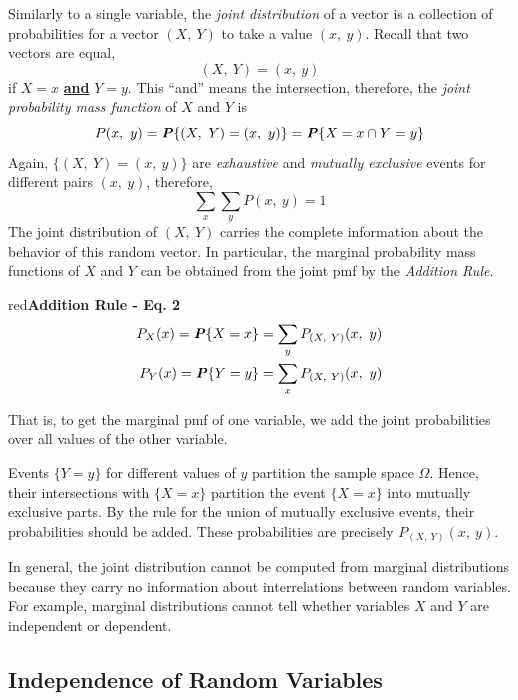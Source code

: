 \documentclass{article}
\newenvironment{formula}[1]{\begin{mybox}{red}{\textbf{#1}}}{\end{mybox}}
\newcommand{\prob}[1]{\textbf{\textit{P}}\{#1\}}
\begin{document}
Similarly to a single variable, the \textit{joint distribution} of a vector is a collection of probabilities for a vector $(X,\ Y)$ to take a value $(x,\ y)$. Recall that two vectors are equal,
\begin{equation*}
    (X,\ Y) = (x,\ y)
\end{equation*}
if $X = x$ \textbf{\underline{and}} $Y = y$. This ``and'' means the intersection, therefore, the \textit{joint probability mass function} of $X$ and $Y$ is
\begin{equation*}
    P(x,\ y) = \prob{(X,\ Y) = (x,\ y)} = \prob{X = x \cap Y = y}
\end{equation*}
Again, $\{(X,\ Y ) = (x,\ y)\}$ are \textit{exhaustive} and \textit{mutually exclusive} events for different pairs $(x,\ y)$, therefore,
\begin{equation*}
    \sum_x \sum_y P(x,\ y) = 1
\end{equation*}
The joint distribution of $(X,\ Y)$ carries the complete information about the behavior of this random vector. In particular, the marginal probability mass functions of $X$ and $Y$ can be obtained from the joint pmf by the \textit{Addition Rule}.

\begin{formula}{Addition Rule - Eq. 2}
\begin{align*}
    P_X(x) = \prob{X = x} = \sum_y P_{(X,\ Y)} (x,\ y)\\
    P_Y(x) = \prob{Y = y} = \sum_x P_{(X,\ Y)} (x,\ y)\\
\end{align*}
\end{formula}
That is, to get the marginal pmf of one variable, we add the joint probabilities over all values of the other variable.

Events $\{Y = y\}$ for different values of $y$ partition the sample space $\Omega$. Hence, their intersections with $\{X = x\}$ partition the event $\{X = x\}$ into mutually exclusive parts. By the rule for the union of mutually exclusive events, their probabilities should be added. These probabilities are precisely $P_{(X,\ Y)}(x,\ y)$.

In general, the joint distribution cannot be computed from marginal distributions because they carry no information about interrelations between random variables. For example, marginal distributions cannot tell whether variables $X$ and $Y$ are independent or dependent.

\subsection{Independence of Random Variables}
\end{document}
